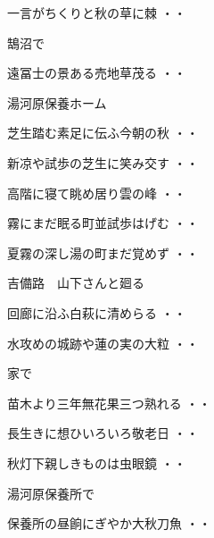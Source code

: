 \vspace{0.6cm}
\begin{shiika}一言がちくりと秋の草に棘
\hfill{・・}\end{shiika}
\vspace{0.6cm}
鵠沼で
\begin{shiika}遠冨士の景ある売地草茂る
\hfill{・・}\end{shiika}
\vspace{0.6cm}
湯河原保養ホーム
\begin{shiika}芝生踏む素足に伝ふ今朝の秋
\hfill{・・}\end{shiika}
\begin{shiika}新凉や試歩の芝生に笑み交す
\hfill{・・}\end{shiika}
\begin{shiika}高階に寝て眺め居り雲の峰
\hfill{・・}\end{shiika}
\begin{shiika}霧にまだ眠る町並試歩はげむ
\hfill{・・}\end{shiika}
\begin{shiika}夏霧の深し湯の町まだ覚めず
\hfill{・・}\end{shiika}
\vspace{0.6cm}
吉備路　山下さんと廻る
\begin{shiika}回廊に沿ふ白萩に清めらる
\hfill{・・}\end{shiika}
\begin{shiika}水攻めの城跡や蓮の実の大粒
\hfill{・・}\end{shiika}
\vspace{0.6cm}
家で
\begin{shiika}苗木より三年無花果三つ熟れる
\hfill{・・}\end{shiika}
\begin{shiika}長生きに想ひいろいろ敬老日
\hfill{・・}\end{shiika}
\begin{shiika}秋灯下親しきものは虫眼鏡
\hfill{・・}\end{shiika}
\vspace{0.6cm}
湯河原保養所で
\begin{shiika}保養所の昼餉にぎやか大秋刀魚
\hfill{・・}\end{shiika}
